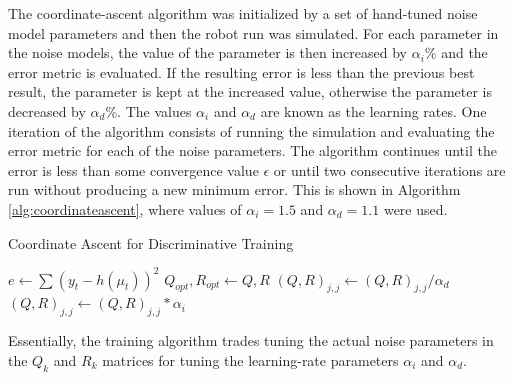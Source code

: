The coordinate-ascent algorithm was initialized by a set of hand-tuned noise model parameters and then the robot run was simulated. For each parameter in the noise models, the value of the parameter is then increased by $\alpha_i \%$ and the error metric is evaluated. If the resulting error is less than the previous best result, the parameter is kept at the increased value, otherwise the parameter is decreased by $\alpha_d \%$. The values $\alpha_i$ and $\alpha_d$ are known as the learning rates. One iteration of the algorithm consists of running the simulation and evaluating the error metric for each of the noise parameters. The algorithm continues until the error is less than some convergence value $\epsilon$ or until two consecutive iterations are run without producing a new minimum error. This is shown in Algorithm \ref{alg:coordinateascent}, where values of $\alpha_i=1.5$ and $\alpha_d=1.1$ were used.

\begin{algorithm}
\caption{Coordinate Ascent for Discriminative Training}
\label{alg:coordinateascent}
\begin{algorithmic}
        \STATE $e \gets \sum(y_t-h(\mu_t))^2$
            \STATE $Q_{opt}, R_{opt} \gets Q, R$
            \STATE $(Q,R)_{j,j} \gets (Q,R)_{j,j} / \alpha_d$
        \ELSE
            \STATE $(Q,R)_{j,j} \gets (Q,R)_{j,j} * \alpha_i$
        \ENDIF
    \ENDFOR
\ENDWHILE
\end{algorithmic}
\end{algorithm}

Essentially, the training algorithm trades tuning the actual noise parameters in the $Q_k$ and $R_k$ matrices for tuning the learning-rate parameters $\alpha_i$ and $\alpha_d$.
